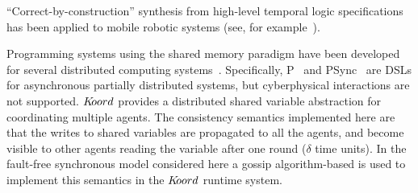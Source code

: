 ``Correct-by-construction'' synthesis from high-level temporal logic specifications has been applied to mobile robotic systems (see, for example~\cite{kress2009temporal,kloetzer2008fully,wongpiromsarn2010receding,wongpiromsarn2011tulip,ulusoy2013optimality}).


%
Programming systems using the  shared memory paradigm have been developed for several distributed computing systems~\cite{dsm1991,Adve96sharedmemory,Azure,Cassandra,Dynamo}.
Specifically, P~\cite{Planguage}  and PSync~\cite{PSyncLanguage} are DSLs for  asynchronous partially  distributed systems, but cyberphysical interactions are not supported. 
$K\kern-2pt oord$  provides a distributed shared variable abstraction for coordinating multiple agents. 
The consistency semantics implemented here are that the writes to shared variables are propagated to all the agents, and become visible to other agents reading the variable after one round ($\delta$ time units).
In the fault-free synchronous model considered here a gossip algorithm-based is used to implement this semantics in the $K\kern-2pt oord$ runtime system. 
%

